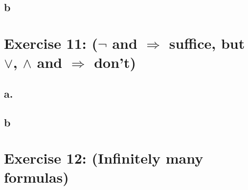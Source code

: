 \documentclass[12pt]{article}
\begin{document}
\subsection*{b}

\section*{Exercise 11:  ($\neg$ and $\Rightarrow$ suffice, but $\lor$, $\land$ and $\Rightarrow$ don’t)}

\subsection*{a.}

\subsection*{b}

\section*{Exercise 12: (Infinitely many formulas)}

\end{document}
